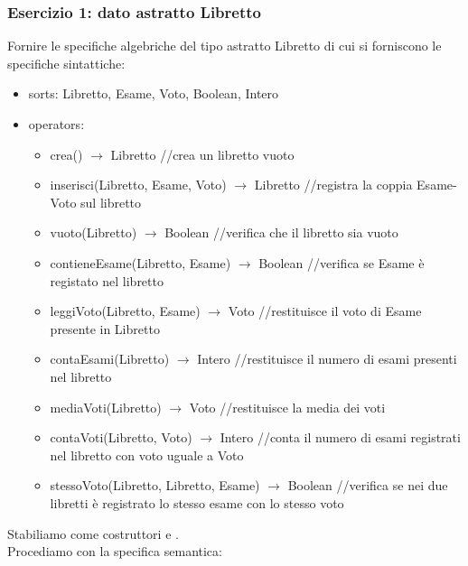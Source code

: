 \documentclass{article}
\begin{document}
	\subsubsection*{Esercizio 1: dato astratto Libretto}
	Fornire le specifiche algebriche del tipo astratto Libretto di cui si forniscono le specifiche sintattiche:
	\begin{itemize}
		\item sorts: Libretto, Esame, Voto, Boolean, Intero
		\item operators:
		\begin{itemize}
			\item crea() $\rightarrow$ Libretto //crea un libretto vuoto
			\item inserisci(Libretto, Esame, Voto) $\rightarrow$ Libretto //registra la coppia Esame-Voto sul libretto
			\item vuoto(Libretto) $\rightarrow$ Boolean //verifica che il libretto sia vuoto
			\item contieneEsame(Libretto, Esame) $\rightarrow$ Boolean //verifica se Esame è registato nel libretto
			\item leggiVoto(Libretto, Esame) $\rightarrow$ Voto //restituisce il voto di Esame presente in Libretto
			\item contaEsami(Libretto) $\rightarrow$ Intero //restituisce il numero di esami presenti nel libretto
			\item mediaVoti(Libretto) $\rightarrow$ Voto //restituisce la media dei voti
			\item contaVoti(Libretto, Voto) $\rightarrow$ Intero //conta il numero di esami registrati nel libretto con voto uguale a Voto
			\item stessoVoto(Libretto, Libretto, Esame) $\rightarrow$ Boolean //verifica se nei due libretti è registrato lo stesso esame con lo stesso voto
		\end{itemize}
	\end{itemize}
	Stabiliamo come costruttori  e . \\
	Procediamo con la specifica semantica:
\end{document}
